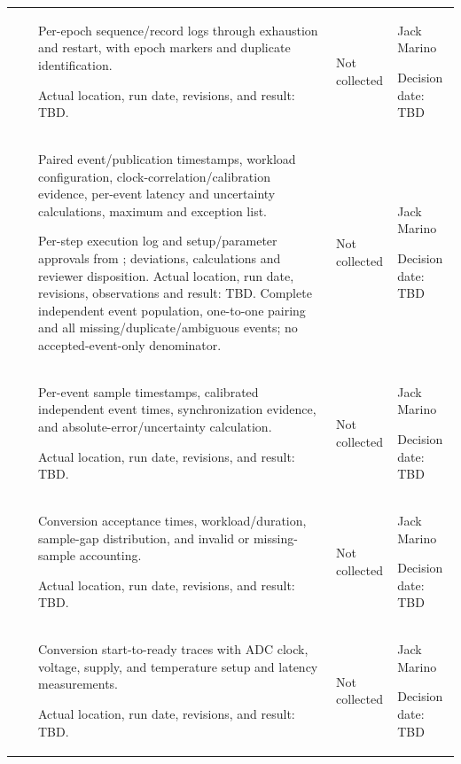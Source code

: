 \begin{landscape}
\begin{tabularx}{\linewidth}{L{2.0cm}L{3.3cm}Y L{2.3cm}L{2.6cm}}
 & \par {} & Per-epoch sequence/record logs through exhaustion and restart, with epoch markers and duplicate identification.\par Actual location, run date, revisions, and result: TBD. & Not collected & Jack Marino\par Decision date: TBD\\
 & \par {} & Paired event/publication timestamps, workload configuration, clock-correlation/calibration evidence, per-event latency and uncertainty calculations, maximum and exception list.\par Per-step execution log and setup/parameter approvals from ; deviations, calculations and reviewer disposition. Actual location, run date, revisions, observations and result: TBD. Complete independent event population, one-to-one pairing and all missing/duplicate/ambiguous events; no accepted-event-only denominator. & Not collected & Jack Marino\par Decision date: TBD\\
 & \par {} & Per-event sample timestamps, calibrated independent event times, synchronization evidence, and absolute-error/uncertainty calculation.\par Actual location, run date, revisions, and result: TBD. & Not collected & Jack Marino\par Decision date: TBD\\
 & \par {} & Conversion acceptance times, workload/duration, sample-gap distribution, and invalid or missing-sample accounting.\par Actual location, run date, revisions, and result: TBD. & Not collected & Jack Marino\par Decision date: TBD\\
 & \par {} & Conversion start-to-ready traces with ADC clock, voltage, supply, and temperature setup and latency measurements.\par Actual location, run date, revisions, and result: TBD. & Not collected & Jack Marino\par Decision date: TBD\\

\end{tabularx}
\end{landscape}

